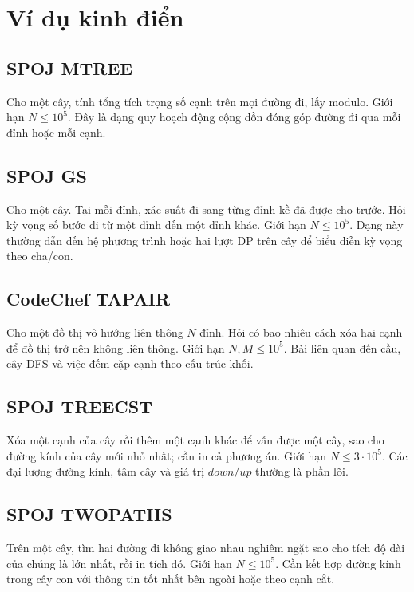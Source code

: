 \documentclass[11pt]{article}
\begin{document}
\section{Ví dụ kinh điển}

\subsection{SPOJ MTREE}

Cho một cây, tính tổng tích trọng số cạnh trên mọi đường đi, lấy modulo. Giới
hạn \(N \le 10^5\). Đây là dạng quy hoạch động cộng dồn đóng góp đường đi qua
mỗi đỉnh hoặc mỗi cạnh.

\subsection{SPOJ GS}

Cho một cây. Tại mỗi đỉnh, xác suất đi sang từng đỉnh kề đã được cho trước.
Hỏi kỳ vọng số bước đi từ một đỉnh đến một đỉnh khác. Giới hạn
\(N \le 10^5\). Dạng này thường dẫn đến hệ phương trình hoặc hai lượt DP trên
cây để biểu diễn kỳ vọng theo cha/con.

\subsection{CodeChef TAPAIR}

Cho một đồ thị vô hướng liên thông \(N\) đỉnh. Hỏi có bao nhiêu cách xóa hai
cạnh để đồ thị trở nên không liên thông. Giới hạn \(N,M \le 10^5\). Bài liên
quan đến cầu, cây DFS và việc đếm cặp cạnh theo cấu trúc khối.

\subsection{SPOJ TREECST}

Xóa một cạnh của cây rồi thêm một cạnh khác để vẫn được một cây, sao cho đường
kính của cây mới nhỏ nhất; cần in cả phương án. Giới hạn \(N \le 3\cdot 10^5\).
Các đại lượng đường kính, tâm cây và giá trị \(down/up\) thường là phần lõi.

\subsection{SPOJ TWOPATHS}

Trên một cây, tìm hai đường đi không giao nhau nghiêm ngặt sao cho tích độ dài
của chúng là lớn nhất, rồi in tích đó. Giới hạn \(N \le 10^5\). Cần kết hợp
đường kính trong cây con với thông tin tốt nhất bên ngoài hoặc theo cạnh cắt.
\end{document}

